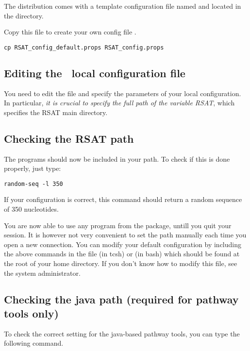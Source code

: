 \documentclass[12pt,a4paper, oneside]{scrreprt} %
\begin{document}
The \RSAT distribution comes with a template configuration file named
 and located in the 
directory.

Copy this file to create your own config file .

\begin{lstlisting}
cp RSAT_config_default.props RSAT_config.props
\end{lstlisting}


\subsection{Editing the \RSAT\ local configuration file}

You need to edit the file  and specify the
parameters of your local configuration. In particular, \emph{it is
  crucial to specify the full path of the variable RSAT}, which
specifies the RSAT main directory.

\subsection{Checking the RSAT path}

The \RSAT programs should now be included in your path.  To check if
this is done properly, just type:

\begin{lstlisting}
random-seq -l 350
\end{lstlisting}

If your configuration is correct, this command should return a random
sequence of 350 nucleotides.

You are now able to use any program from the \RSAT package, untill you
quit your session. It is however not very convenient to set the path
manually each time you open a new connection. You can modify your
default configuration by including the above commands in the file
 (in tcsh) or  (in bash) which should be
found at the root of your home directory. If you don't know how to
modify this file, see the system administrator.

\subsection{Checking the java path (required for pathway tools only)}

To check the correct setting for the java-based pathway tools, you can
type the following command.
\end{document}
